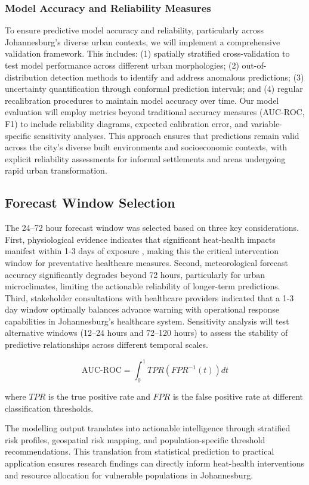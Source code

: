 \subsubsection{Model Accuracy and Reliability Measures}
To ensure predictive model accuracy and reliability, particularly across Johannesburg's diverse urban contexts, we will implement a comprehensive validation framework. This includes: (1) spatially stratified cross-validation to test model performance across different urban morphologies; (2) out-of-distribution detection methods to identify and address anomalous predictions; (3) uncertainty quantification through conformal prediction intervals; and (4) regular recalibration procedures to maintain model accuracy over time. Our model evaluation will employ metrics beyond traditional accuracy measures (AUC-ROC, F1) to include reliability diagrams, expected calibration error, and variable-specific sensitivity analyses. This approach ensures that predictions remain valid across the city's diverse built environments and socioeconomic contexts, with explicit reliability assessments for informal settlements and areas undergoing rapid urban transformation.

\subsection{Forecast Window Selection}
The 24--72 hour forecast window was selected based on three key considerations. First, physiological evidence indicates that significant heat-health impacts manifest within 1-3 days of exposure \citep{Gasparrini2015, Kinney2020}, making this the critical intervention window for preventative healthcare measures. Second, meteorological forecast accuracy significantly degrades beyond 72 hours, particularly for urban microclimates, limiting the actionable reliability of longer-term predictions. Third, stakeholder consultations with healthcare providers indicated that a 1-3 day window optimally balances advance warning with operational response capabilities in Johannesburg's healthcare system. Sensitivity analysis will test alternative windows (12--24 hours and 72--120 hours) to assess the stability of predictive relationships across different temporal scales.

\begin{equation}
\text{AUC-ROC} = \int^1_0 TPR(FPR^{-1}(t))dt
\end{equation}

where $TPR$ is the true positive rate and $FPR$ is the false positive rate at different classification thresholds.

The modelling output translates into actionable intelligence through stratified risk profiles, geospatial risk mapping, and population-specific threshold recommendations. This translation from statistical prediction to practical application ensures research findings can directly inform heat-health interventions and resource allocation for vulnerable populations in Johannesburg.